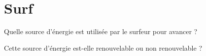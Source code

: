 \section{Surf}\label{ex:surf}

\begin{questions}
	\question Quelle source d'énergie est utilisée par le surfeur pour avancer ?
	
	\question Cette source d'énergie est-elle renouvelable ou non renouvelable ?
\end{questions}